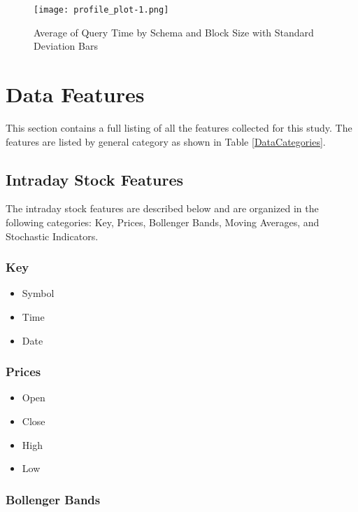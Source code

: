 \documentclass[journal]{IEEEtran}
\begin{document}
\begin{figure}
	\centering
	\texttt{[image: profile\_plot-1.png]}
	\caption{Average of Query Time by Schema and Block Size with Standard Deviation Bars}
	\label{HDFS}
\end{figure}

\appendices

\section{Data Features}
\label{DataFeatures}

This section contains a full listing of all the features collected for this
 study. The features are listed by general category as shown in 
 Table \ref{DataCategories}.

\subsection{Intraday Stock Features}

The intraday stock features are described below and are organized in the 
 following categories: Key, Prices, Bollenger Bands, Moving Averages, and Stochastic 
 Indicators.

\subsubsection{Key}

\begin{itemize}
	\item Symbol
	\item Time
	\item Date
\end{itemize}

\subsubsection{Prices}

\begin{itemize}
	\item Open
	\item Close
	\item High
	\item Low
\end{itemize}

\subsubsection{Bollenger Bands}
\end{document}
